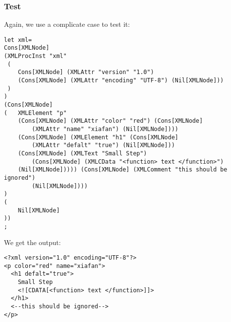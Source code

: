 \subsubsection{Test}
Again, we use a complicate case to test it:
\begin{lstlisting}
let xml=
Cons[XMLNode]
(XMLProcInst "xml"
 (
    Cons[XMLNode] (XMLAttr "version" "1.0")
    (Cons[XMLNode] (XMLAttr "encoding" "UTF-8") (Nil[XMLNode]))
 )
)
(Cons[XMLNode]
(   XMLElement "p"
    (Cons[XMLNode] (XMLAttr "color" "red") (Cons[XMLNode]
        (XMLAttr "name" "xiafan") (Nil[XMLNode])))
    (Cons[XMLNode] (XMLElement "h1" (Cons[XMLNode]
        (XMLAttr "defalt" "true") (Nil[XMLNode]))
    (Cons[XMLNode] (XMLText "Small Step")
        (Cons[XMLNode] (XMLCData "<function> text </function>")
    (Nil[XMLNode])))) (Cons[XMLNode] (XMLComment "this should be ignored")
        (Nil[XMLNode])))
)
(
    Nil[XMLNode]
))
;
\end{lstlisting}

We get the output:
\begin{lstlisting}
<?xml version="1.0" encoding="UTF-8"?>
<p color="red" name="xiafan">
  <h1 defalt="true">
    Small Step
    <![CDATA[<function> text </function>]]>
  </h1>
  <--this should be ignored-->
</p>
\end{lstlisting}

